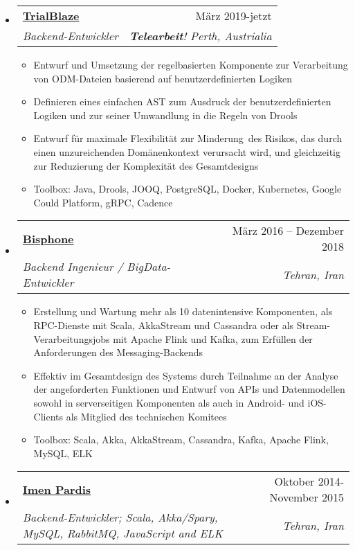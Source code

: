 \documentclass[letterpaper,12pt]{article}[leftmargin=*]
\makeatletter
\def \entryspacing {-0pt}
\newcommand{\resumeEntryStart}{\begin{itemize}[leftmargin=2.5mm]}
\newcommand{\resumeEntryEnd}{\end{itemize}\vspace{\entryspacing}}
\newcommand{\resumeItemListStart}{\begin{itemize}[leftmargin=4.5mm]}
\newcommand{\resumeItemListEnd}{\end{itemize}}
\newcommand{\resumeItem}[1]{
  \item\small{
    {#1 \vspace{-2pt}}
  }
}
\newcommand{\resumeEntryTSDL}[4]{
  \vspace{-1pt}\item[]
    \begin{tabular*}{0.97\textwidth}{l@{\extracolsep{\fill}}r}
      \textbf{\color{primary}#1} & {\firabook\color{accent}\small#2} \\
      \textit{\color{accent}\small#3} & \textit{\color{accent}\small#4} \\
    \end{tabular*}\vspace{-6pt}
}
\makeatother
\begin{document}
  \resumeEntryStart
    \resumeEntryTSDL
      {\href{https://trialblaze.com}{TrialBlaze}}{März 2019-jetzt}
      {Backend-Entwickler}{\textbf{Telearbeit}! Perth, Austrialia}
    \resumeItemListStart
	  \resumeItem {Entwurf und Umsetzung der regelbasierten Komponente zur Verarbeitung von ODM-Dateien basierend auf benutzerdefinierten Logiken}
      \resumeItem{Definieren eines einfachen AST zum Ausdruck der benutzerdefinierten Logiken und zur seiner Umwandlung in die Regeln von Drools}
      \resumeItem{Entwurf für maximale Flexibilität zur Minderung des Risikos, das durch einen unzureichenden Domänenkontext verursacht wird, und gleichzeitig zur Reduzierung der Komplexität des Gesamtdesigns}
      \resumeItem{Toolbox: Java, Drools, JOOQ, PostgreSQL, Docker, Kubernetes, Google Could Platform, gRPC, Cadence}
    \resumeItemListEnd
  \resumeEntryEnd


  \resumeEntryStart
    \resumeEntryTSDL
      {\href{http://bisphone.com}{Bisphone}}{März 2016 – Dezember 2018}
      {Backend Ingenieur / BigData-Entwickler}{Tehran, Iran}
    \resumeItemListStart
      \resumeItem{Erstellung und Wartung mehr als 10 datenintensive Komponenten, als RPC-Dienste mit Scala, AkkaStream und Cassandra oder als Stream-Verarbeitungsjobs mit Apache Flink und Kafka, zum Erfüllen der Anforderungen des Messaging-Backends 
}
      \resumeItem{Effektiv im Gesamtdesign des Systems durch Teilnahme an der Analyse der angeforderten Funktionen und Entwurf von APIs und Datenmodellen sowohl in serverseitigen Komponenten als auch in Android- und iOS-Clients als Mitglied des technischen Komitees}
      \resumeItem{Toolbox: Scala, Akka, AkkaStream, Cassandra, Kafka, Apache Flink, MySQL, ELK}
    \resumeItemListEnd
  \resumeEntryEnd


  \resumeEntryStart
    \resumeEntryTSDL
	  {\href{https://imenpardis.com/fa/}{Imen Pardis}}{Oktober 2014- November 2015}
      {Backend-Entwickler; Scala, Akka/Spary, MySQL, RabbitMQ, JavaScript and ELK}{Tehran, Iran}
  \resumeEntryEnd
\end{document}

